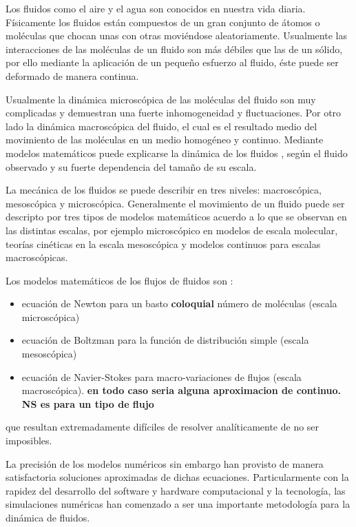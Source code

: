 Los fluidos como el aire y el agua son conocidos en nuestra vida diaria. Físicamente los fluidos están compuestos de un gran conjunto de átomos o moléculas que chocan unas con otras moviéndose  aleatoriamente. Usualmente las interacciones de las moléculas de un fluido son más débiles que las de un sólido, por ello mediante la aplicación de un pequeño esfuerzo al fluido, éste puede ser deformado de manera continua.


Usualmente la dinámica microscópica de las moléculas del fluido son muy complicadas y demuestran una fuerte inhomogeneidad y fluctuaciones.
Por otro lado la dinámica macroscópica del fluido, el cual es el resultado medio del movimiento de las moléculas en un medio homogéneo y continuo.
Mediante modelos matemáticos puede explicarse la dinámica de los fluidos , según el fluido observado y su fuerte dependencia del tamaño de su escala.

La mecánica de los fluidos se puede describir en tres niveles: macroscópica, mesoscópica y microscópica.
Generalmente el movimiento de un fluido puede ser descripto por tres tipos de modelos matemáticos acuerdo a lo que se observan en las distintas escalas, por ejemplo microscópico en modelos de escala molecular, teorías cinéticas en la escala mesoscópica y modelos continuos para escalas macroscópicas.


Los modelos matemáticos de los flujos de fluidos son :

\begin{itemize}
	\item ecuación de Newton para un basto \textbf{coloquial} número de moléculas (escala microscópica)
	\item ecuación de Boltzman para la función de distribución simple (escala mesoscópica)
	\item ecuación de Navier-Stokes para macro-variaciones de flujos (escala macroscópica). \textbf{en todo caso seria alguna aproximacion de continuo. NS es para un tipo de flujo}
\end{itemize}

que resultan extremadamente difíciles de resolver analíticamente de no ser imposibles.

 La precisión de los modelos numéricos sin embargo han provisto de manera satisfactoria soluciones aproximadas de dichas ecuaciones.
Particularmente con la rapidez del desarrollo del software y hardware computacional y la tecnología, las simulaciones numéricas han comenzado a ser una importante metodología para la dinámica de fluidos.

